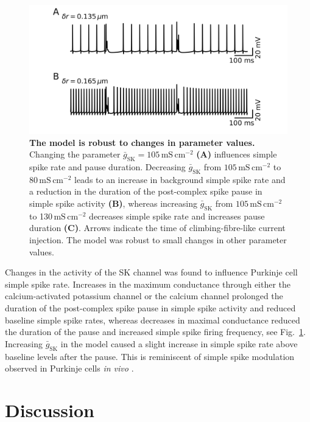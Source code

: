 \documentclass[twocolumn]{svjour3}          %
\newcommand{\msi}{\,\mathrm{mS\,cm^{-2}}}
\newcommand{\sk}{\mathrm{SK}}
\begin{document}
\begin{figure}[!ht]
  \includegraphics[width=\linewidth]{figure_delta_r.jpg}
\caption{\textbf{The model is robust to changes in parameter values.}
 Changing the parameter $\bar{g}_\sk=105\msi$ \textbf{(A)} influences simple
  spike rate and pause duration. Decreasing $\bar{g}_\sk$ from
  $105\msi$ to 80$\msi$ leads to an increase in background simple spike
  rate and a reduction in the duration of the post-complex spike pause
  in simple spike activity \textbf{(B)}, whereas increasing
  $\bar{g}_\sk$ from $105\msi$ to 130$\msi$ decreases simple spike rate
  and increases pause duration \textbf{(C)}. Arrows indicate the time
  of climbing-fibre-like current injection. The model was robust to
  small changes in other parameter values.}
\label{S3_Fig}
\end{figure}



Changes in the activity of the SK channel was found to influence
Purkinje cell simple spike rate. Increases in the maximum conductance
through either the calcium-activated potassium channel or the calcium
channel prolonged the duration of the post-complex spike pause in
simple spike activity and reduced baseline simple spike rates, whereas
decreases in maximal conductance reduced the duration of the pause and
increased simple spike firing frequency, see
Fig.~\ref{S3_Fig}. Increasing $\bar{g}_\sk$ in the model caused a
slight increase in simple spike rate above baseline levels after the
pause. This is reminiscent of simple spike modulation observed in
Purkinje cells \textsl{in vivo} \citep{BurroughsEtAl2016}.


\section{Discussion}
\end{document}
